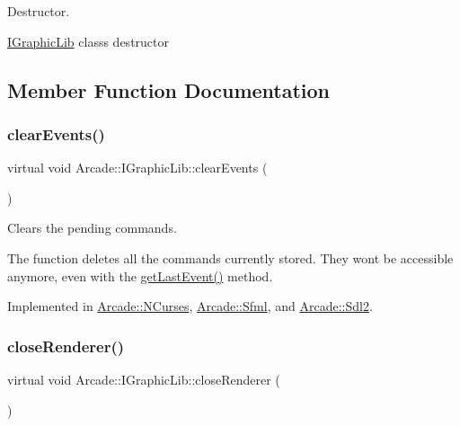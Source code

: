 Destructor. 

\hyperlink{class_arcade_1_1_i_graphic_lib}{I\+Graphic\+Lib} class\textquotesingle{}s destructor 

\subsection{Member Function Documentation}
\mbox{\label{class_arcade_1_1_i_graphic_lib_a78691f8f9433b2af945576231534c1e3}} 
\subsubsection{\texorpdfstring{clear\+Events()}{clearEvents()}}
{\footnotesize\ttfamily virtual void Arcade\+::\+I\+Graphic\+Lib\+::clear\+Events (\begin{DoxyParamCaption}{ }\end{DoxyParamCaption})\hspace{0.3cm}{\ttfamily [pure virtual]}}



Clears the pending commands. 

The function deletes all the commands currently stored. They wont be accessible anymore, even with the \hyperlink{class_arcade_1_1_i_graphic_lib_a801ebd3cff2c861e4b2a1e664c123da7}{get\+Last\+Event()} method. 

Implemented in \hyperlink{class_arcade_1_1_n_curses_a01dd738afe5e5546e165b911091b32cc}{Arcade\+::\+N\+Curses}, \hyperlink{class_arcade_1_1_sfml_a882877eba4037ffe3befd61a4b4f1d18}{Arcade\+::\+Sfml}, and \hyperlink{class_arcade_1_1_sdl2_a92f016d43686b195673aea7f3446d0a1}{Arcade\+::\+Sdl2}.

\mbox{\label{class_arcade_1_1_i_graphic_lib_aa7c3c8b922fbc94f5e74ecfebad52742}} 
\subsubsection{\texorpdfstring{close\+Renderer()}{closeRenderer()}}
{\footnotesize\ttfamily virtual void Arcade\+::\+I\+Graphic\+Lib\+::close\+Renderer (\begin{DoxyParamCaption}{ }\end{DoxyParamCaption})\hspace{0.3cm}{\ttfamily [pure virtual]}}




